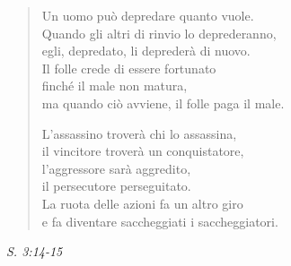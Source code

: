 \begin{quotation}
Un uomo può depredare quanto vuole. \\
Quando gli altri di rinvio lo deprederanno, \\
egli, depredato, li deprederà di nuovo. \\
Il folle crede di essere fortunato \\
finché il male non matura, \\
ma quando ciò avviene, il folle paga il male.


L’assassino troverà chi lo assassina, \\
il vincitore troverà un conquistatore, \\
l’aggressore sarà aggredito, \\
il persecutore perseguitato. \\
La ruota delle azioni fa un altro giro \\
e fa diventare saccheggiati i saccheggiatori.
\end{quotation}

\emph{S. 3:14-15}


